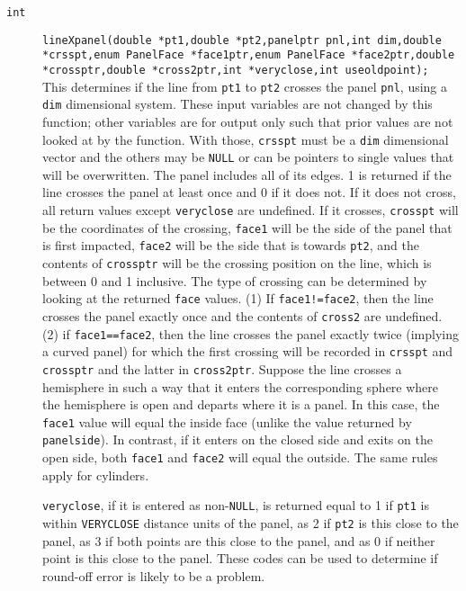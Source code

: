 \documentclass {book}
\begin{document}
\begin{description}
\item[\texttt{int}]
\texttt{lineXpanel(double *pt1,double *pt2,panelptr pnl,int dim,double *crsspt,enum PanelFace *face1ptr,enum PanelFace *face2ptr,double *crossptr,double *cross2ptr,int *veryclose,int useoldpoint);}
\hfill \\
This determines if the line from \texttt{pt1} to \texttt{pt2} crosses the panel \texttt{pnl}, using a \texttt{dim} dimensional system. These input variables are not changed by this function; other variables are for output only such that prior values are not looked at by the function. With those, \texttt{crsspt} must be a \texttt{dim} dimensional vector and the others may be \texttt{NULL} or can be pointers to single values that will be overwritten. The panel includes all of its edges. 1 is returned if the line crosses the panel at least once and 0 if it does not. If it does not cross, all return values except \texttt{veryclose} are undefined. If it crosses, \texttt{crosspt} will be the coordinates of the crossing, \texttt{face1} will be the side of the panel that is first impacted, \texttt{face2} will be the side that is towards \texttt{pt2}, and the contents of \texttt{crossptr} will be the crossing position on the line, which is between 0 and 1 inclusive. The type of crossing can be determined by looking at the returned \texttt{face} values. (1) If \texttt{face1!=face2}, then the line crosses the panel exactly once and the contents of \texttt{cross2} are undefined. (2) if \texttt{face1==face2}, then the line crosses the panel exactly twice (implying a curved panel) for which the first crossing will be recorded in \texttt{crsspt} and \texttt{crossptr} and the latter in \texttt{cross2ptr}. Suppose the line crosses a hemisphere in such a way that it enters the corresponding sphere where the hemisphere is open and departs where it is a panel. In this case, the \texttt{face1} value will equal the inside face (unlike the value returned by \texttt{panelside}). In contrast, if it enters on the closed side and exits on the open side, both \texttt{face1} and \texttt{face2} will equal the outside. The same rules apply for cylinders.

\texttt{veryclose}, if it is entered as non-\texttt{NULL}, is returned equal to 1 if \texttt{pt1} is within \texttt{VERYCLOSE} distance units of the panel, as 2 if \texttt{pt2} is this close to the panel, as 3 if both points are this close to the panel, and as 0 if neither point is this close to the panel. These codes can be used to determine if round-off error is likely to be a problem.


\end{description}
\end{document}
